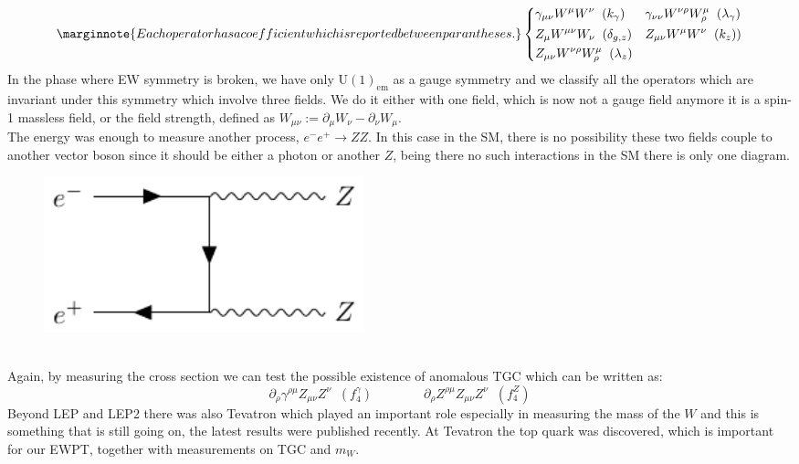 \documentclass[../main.tex]{subfiles}
\begin{document}
\[
\marginnote{Each operator has a coefficient which is reported between parantheses.}
\left\{
\begin{aligned}
&\gamma_{\mu\nu}W^\mu W^\nu\;\; (k_\gamma) && \gamma_{\nu\nu}W^{\nu\rho}W^\mu_\rho\;\; (\lambda_\gamma)\\
&Z_\mu W^{\mu\nu}W_\nu\;\; (\delta_{g,z}) && Z_{\mu\nu}W^\mu W^\nu\;\; (k_z))\\
&Z_{\mu\nu}W^{\nu\rho}W_\rho^\mu\;\; (\lambda_z)
\end{aligned}
\right.
\]
In the phase where EW symmetry is broken, we have only U$(1)_{\text{em}}$ as a gauge symmetry and we classify all the operators which are invariant under this symmetry which involve three fields. We do it either with one field, which is now not a gauge field anymore it is a spin-1 massless field, or the field strength, defined as $W_{\mu\nu}:=\partial_\mu W_\nu-\partial_\nu W_\mu$.\\
The energy was enough to measure another process, $e^-e^+\to ZZ$. In this case in the SM, there is no possibility these two fields couple to another vector boson since it should be either a photon or another $Z$, being there no such interactions in the SM there is only one diagram.
\begin{figure}[h]
    \centering
    \includegraphics[width=0.45\textwidth]{Images/ZZ.pdf}
    \caption*{}
\end{figure}\\
Again, by measuring the cross section we can test the possible existence of anomalous TGC which can be written as:
\[
\partial_\rho\gamma^{\rho\mu}Z_{\mu\nu}Z^\nu\;\;(f_4^\gamma) \qquad \qquad \partial_\rho Z^{\rho\mu}Z_{\mu\nu}Z^\nu\;\;(f_4^Z)
\]
Beyond LEP and LEP2 there was also Tevatron which played an important role especially in measuring the mass of the $W$ and this is something that is still going on, the latest results were published recently. At Tevatron the top quark was discovered, which is important for our EWPT, together with measurements on TGC and $m_W$.
\end{document}
